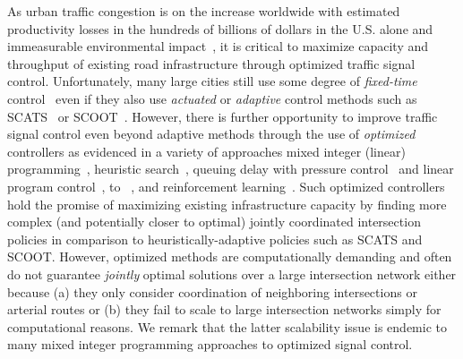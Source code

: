 As urban traffic congestion is on the increase worldwide with
estimated productivity losses in the hundreds of billions of dollars
in the U.S. alone and immeasurable environmental
impact~\cite{bazzan2013intro}, it is critical to maximize capacity and
throughput of existing road infrastructure through optimized traffic
signal control.  Unfortunately, many large cities still use some
degree of \emph{fixed-time} control~ even
if they also use \emph{actuated} or \emph{adaptive} control methods
such as SCATS~ or SCOOT~.
However, there is further opportunity to improve traffic signal
control even beyond adaptive methods through the use of
\emph{optimized} controllers  as evidenced in a variety of approaches
 mixed integer (linear)
programming~,
heuristic search~,
queuing delay with pressure control~ 
and linear program control~, to
~,
and reinforcement
learning~.  Such optimized
controllers hold the promise of maximizing existing infrastructure
capacity by finding more complex (and potentially closer to optimal)
jointly coordinated intersection policies in comparison to
heuristically-adaptive policies such as SCATS and SCOOT. 
However, optimized methods are computationally demanding 
and often do not guarantee \emph{jointly} optimal solutions over a
large intersection network either because (a) they only consider
coordination of neighboring intersections or arterial routes or (b)
they fail to scale to large intersection networks simply for
computational reasons.  We remark that the latter scalability issue is endemic
to many mixed integer programming approaches to optimized signal control.

